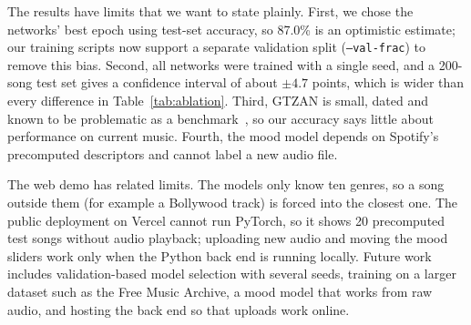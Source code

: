 \documentclass[conference]{IEEEtran}
\begin{document}
The results have limits that we want to state plainly. First, we chose the networks' best epoch using test-set accuracy, so 87.0\% is an optimistic estimate; our training scripts now support a separate validation split (\texttt{--val-frac}) to remove this bias. Second, all networks were trained with a single seed, and a 200-song test set gives a confidence interval of about $\pm4.7$ points, which is wider than every difference in Table~\ref{tab:ablation}. Third, GTZAN is small, dated and known to be problematic as a benchmark~\cite{sturm2014}, so our accuracy says little about performance on current music. Fourth, the mood model depends on Spotify's precomputed descriptors and cannot label a new audio file.

The web demo has related limits. The models only know ten genres, so a song outside them (for example a Bollywood track) is forced into the closest one. The public deployment on Vercel cannot run PyTorch, so it shows 20 precomputed test songs without audio playback; uploading new audio and moving the mood sliders work only when the Python back end is running locally. Future work includes validation-based model selection with several seeds, training on a larger dataset such as the Free Music Archive, a mood model that works from raw audio, and hosting the back end so that uploads work online.

\end{document}
